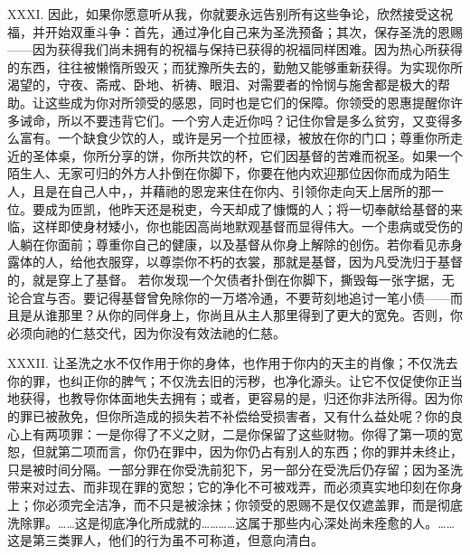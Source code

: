 XXXI. 因此，如果你愿意听从我，你就要永远告别所有这些争论，欣然接受这祝福，并开始双重斗争：首先，通过净化自己来为圣洗预备；其次，保存圣洗的恩赐——因为获得我们尚未拥有的祝福与保持已获得的祝福同样困难。因为热心所获得的东西，往往被懒惰所毁灭；而犹豫所失去的，勤勉又能够重新获得。为实现你所渴望的，守夜、斋戒、卧地、祈祷、眼泪、对需要者的怜悯与施舍都是极大的帮助。让这些成为你对所领受的感恩，同时也是它们的保障。你领受的恩惠提醒你许多诫命，所以不要违背它们。一个穷人走近你吗？记住你曾是多么贫穷，又变得多么富有。一个缺食少饮的人，或许是另一个拉匝禄，被放在你的门口；尊重你所走近的圣体桌，你所分享的饼，你所共饮的杯，它们因基督的苦难而祝圣。如果一个陌生人、无家可归的外方人扑倒在你脚下，你要在他内欢迎那位因你而成为陌生人，且是在自己人中，，并藉祂的恩宠来住在你内、引领你走向天上居所的那一位。要成为匝凯，他昨天还是税吏，今天却成了慷慨的人；将一切奉献给基督的来临，这样即使身材矮小，你也能因高尚地默观基督而显得伟大。一个患病或受伤的人躺在你面前；尊重你自己的健康，以及基督从你身上解除的创伤。若你看见赤身露体的人，给他衣服穿，以尊崇你不朽的衣裳，那就是基督，因为凡受洗归于基督的，就是穿上了基督。 若你发现一个欠债者扑倒在你脚下，撕毁每一张字据，无论合宜与否。要记得基督曾免除你的一万塔冷通，不要苛刻地追讨一笔小债——而且是从谁那里？从你的同伴身上，你尚且从主人那里得到了更大的宽免。否则，你必须向祂的仁慈交代，因为你没有效法祂的仁慈。\par

XXXII. 让圣洗之水不仅作用于你的身体，也作用于你内的天主的肖像；不仅洗去你的罪，也纠正你的脾气；不仅洗去旧的污秽，也净化源头。让它不仅促使你正当地获得，也教导你体面地失去拥有；或者，更容易的是，归还你非法所得。因为你的罪已被赦免，但你所造成的损失若不补偿给受损害者，又有什么益处呢？你的良心上有两项罪：一是你得了不义之财，二是你保留了这些财物。你得了第一项的宽恕，但就第二项而言，你仍在罪中，因为你仍占有别人的东西；你的罪并未终止，只是被时间分隔。一部分罪在你受洗前犯下，另一部分在受洗后仍存留；因为圣洗带来对过去、而非现在罪的宽恕；它的净化不可被戏弄，而必须真实地印刻在你身上；你必须完全洁净，而不只是被涂抹；你领受的恩赐不是仅仅遮盖罪，而是彻底洗除罪。……这是彻底净化所成就的…………这属于那些内心深处尚未痊愈的人。……这是第三类罪人，他们的行为虽不可称道，但意向清白。\par

